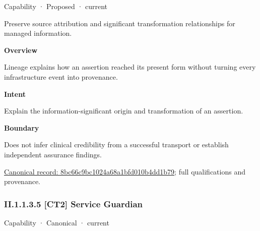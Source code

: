 \label{element:8bc66c9bc1024a68a1bfd010b4dd1b79}
{\small Capability · Proposed · current}\par

Preserve source attribution and significant transformation relationships for managed information.



\textbf{Overview}



Lineage explains how an assertion reached its present form without turning every infrastructure event into provenance.



\textbf{Intent}



Explain the information-significant origin and transformation of an assertion.



\textbf{Boundary}



Does not infer clinical credibility from a successful transport or establish independent assurance findings.


{\footnotesize \href{../../../../../../../continuum/strategy/capability/8bc66c9bc1024a68a1bfd010b4dd1b79.md}{Canonical record: 8bc66c9bc1024a68a1bfd010b4dd1b79}; full qualifications and provenance.}\par
\subsubsection*{II.1.1.3.5 [CT2] Service Guardian}
\label{navigation:II.1.1.3.5}

\label{element:d767f12f9b1c495883216ace464ee1c2}
{\small Capability · Canonical · current}\par

